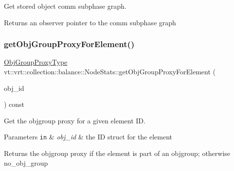 Get stored object comm subphase graph. 

\begin{DoxyReturn}{Returns}
an observer pointer to the comm subphase graph 
\end{DoxyReturn}
\mbox{\label{structvt_1_1vrt_1_1collection_1_1balance_1_1_node_stats_a4a5312c428f08b526097d146a24b5766}} 
\subsubsection{\texorpdfstring{get\+Obj\+Group\+Proxy\+For\+Element()}{getObjGroupProxyForElement()}}
{\footnotesize\ttfamily \hyperlink{namespacevt_ad7cae989df485fccca57f0792a880a8e}{Obj\+Group\+Proxy\+Type} vt\+::vrt\+::collection\+::balance\+::\+Node\+Stats\+::get\+Obj\+Group\+Proxy\+For\+Element (\begin{DoxyParamCaption}\item[{\hyperlink{namespacevt_1_1vrt_1_1collection_1_1balance_a9f5b53fafb270212279a4757d2c4cd28}{Element\+I\+D\+Struct}}]{obj\+\_\+id }\end{DoxyParamCaption}) const}



Get the objgroup proxy for a given element ID. 


\begin{DoxyParams}[1]{Parameters}
\mbox{\tt in}  & {\em obj\+\_\+id} & the ID struct for the element\\
\hline
\end{DoxyParams}
\begin{DoxyReturn}{Returns}
the objgroup proxy if the element is part of an objgroup; otherwise {\ttfamily no\+\_\+obj\+\_\+group} 
\end{DoxyReturn}
\mbox{\label{structvt_1_1vrt_1_1collection_1_1balance_1_1_node_stats_acaa90ee226b8e183ac4881c1aa86da46}} 
